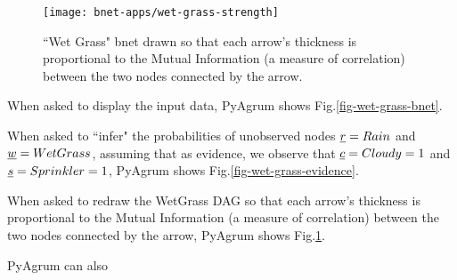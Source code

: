 \begin{figure}[h!]
\centering
\texttt{[image: bnet-apps/wet-grass-strength]}
\caption{``Wet Grass" bnet drawn so that each arrow's thickness
is proportional to the Mutual Information (a measure of
correlation) between the two nodes connected by the arrow.}
\label{fig-wet-grass-strength}
\end{figure}


When asked to display the input data, PyAgrum shows Fig.\ref{fig-wet-grass-bnet}.



When asked to ``infer" the probabilities of unobserved nodes ${\underline{r}}=Rain$
and ${\underline{w}}=WetGrass$,
assuming that as evidence, we observe that ${\underline{c}}=Cloudy=1$ and ${\underline{s}}=Sprinkler=1$, PyAgrum shows Fig.\ref{fig-wet-grass-evidence}.

When asked to redraw the WetGrass DAG so that each arrow's thickness
is proportional to the Mutual Information (a measure of
correlation) between the two nodes connected by the arrow,
PyAgrum shows Fig.\ref{fig-wet-grass-strength}.


PyAgrum can also  

